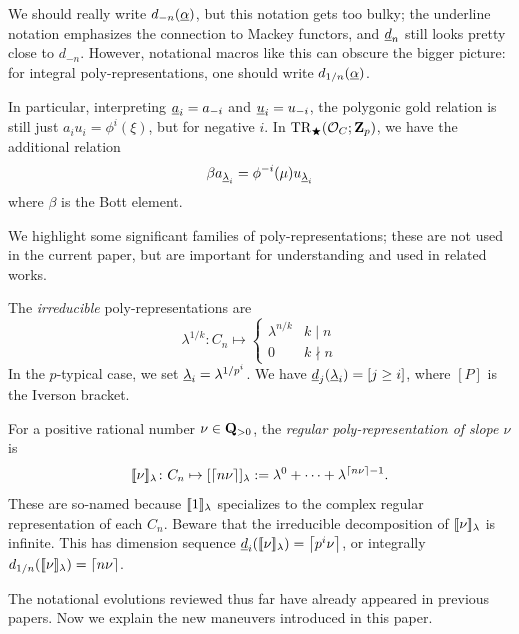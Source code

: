 \begin{warning}
  We should really write $d_{-n}(\underline\alpha)$, but this notation gets too bulky; the underline notation emphasizes the connection to Mackey functors, and $\underline d_n$ still looks pretty close to $d_{-n}$. However, notational macros like this can obscure the bigger picture: for integral poly-representations, one should write $d_{1/n}(\underline\alpha)$.
\end{warning}

In particular, interpreting $\underline a_i = a_{-i}$ and $\underline u_i = u_{-i}$, the polygonic gold relation is still just $a_i u_i = \phi^i(\xi)$, but for negative $i$. In $\mathrm{TR}_\bigstar(\mathcal O_C;\mathbf Z_p)$, we have the additional relation
\[
  \beta a_{\underline\lambda_i} = \phi^{-i}(\mu) u_{\underline\lambda_i}
\]
where $\beta$ is the Bott element.

We highlight some significant families of poly-representations; these are not used in the current paper, but are important for understanding and used in related works.

\begin{definition}
  The \emph{irreducible} poly-representations are
  \[ \lambda^{1/k}\colon C_n \mapsto \begin{cases} \lambda^{n/k} & k\mid n\\ 0 & k\nmid n\end{cases} \]
  In the $p$-typical case, we set $\underline\lambda_i = \lambda^{1/p^i}$. We have $\underline d_j(\underline\lambda_i) = [j \ge i]$, where $[P]$ is the Iverson bracket.
\end{definition}

\begin{definition}
  \label{def:regular-poly}
  For a positive rational number $\nu\in\mathbf Q_{>0}$, the \emph{regular poly-representation of slope $\nu$} is
  \[ [\![\nu]\!]_\lambda\colon C_n \mapsto [\left\lceil n\nu\right\rceil]_\lambda \mathrel{:=} \lambda^0 + \dotsb + \lambda^{\left\lceil n\nu\right\rceil-1}. \]
  These are so-named because $[\![1]\!]_\lambda$ specializes to the complex regular representation of each $C_n$. Beware that the irreducible decomposition of $[\![\nu]\!]_\lambda$ is infinite. This has dimension sequence $\underline d_i([\![\nu]\!]_\lambda) = \left\lceil p^i\nu\right\rceil$, or integrally $d_{1/n}([\![\nu]\!]_\lambda)=\left\lceil n\nu\right\rceil$.
\end{definition}

The notational evolutions reviewed thus far have already appeared in previous papers. Now we explain the new maneuvers introduced in this paper.

